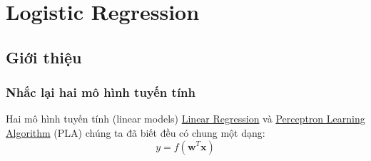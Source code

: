 \chapter{Logistic Regression}
 
 
 
 
\section{Giới thiệu}
 
 
\subsection{Nhắc lại hai mô hình tuyến tính}
Hai mô hình tuyến tính (linear models) \href{http://machinelearningcoban.com/2016/12/28/linearregression/}{Linear Regression} và \href{http://machinelearningcoban.com/2017/01/21/perceptron/}{Perceptron Learning Algorithm} (PLA) chúng ta đã biết đều có chung một dạng: 
\begin{equation*} 
y = f(\mathbf{w}^T\mathbf{x}) 
\end{equation*} 
 
